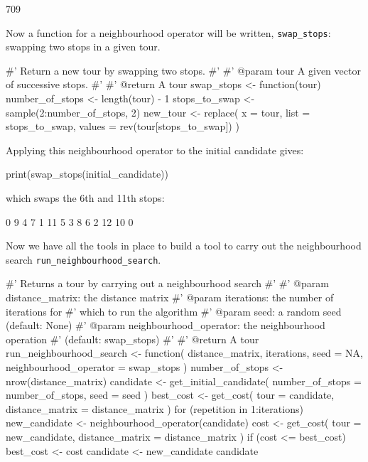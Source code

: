 \begin{Rout}
[1] 709
\end{Rout}

Now a function for a neighbourhood operator will be written,
\texttt{swap_stops}: swapping two stops in a given tour.

\begin{Rin}
#' Return a new tour by swapping two stops.
#'
#' @param tour A given vector of successive stops.
#'
#' @return A tour
swap_stops <- function(tour){
  number_of_stops <- length(tour) - 1
  stops_to_swap <- sample(2:number_of_stops, 2)
  new_tour <- replace(
    x = tour,
    list = stops_to_swap,
    values = rev(tour[stops_to_swap])
  )
}
\end{Rin}

Applying this neighbourhood operator to the initial candidate gives:

\begin{Rin}
print(swap_stops(initial_candidate))
\end{Rin}

which swaps the 6th and 11th stops:

\begin{Rout}
 [1]  0  9  4  7  1 11  5  3  8  6  2 12 10  0
\end{Rout}

Now we have all the tools in place to build a tool to carry out the
neighbourhood search \texttt{run_neighbourhood_search}.

\begin{Rin}
#' Returns a tour by carrying out a neighbourhood search
#'
#' @param distance_matrix: the distance matrix
#' @param iterations: the number of iterations for
#'                    which to run the algorithm
#' @param seed: a random seed (default: None)
#' @param neighbourhood_operator: the neighbourhood operation
#'                                (default: swap_stops)
#'
#' @return A tour
run_neighbourhood_search <- function(
  distance_matrix,
  iterations,
  seed = NA,
  neighbourhood_operator = swap_stops
){
  number_of_stops <- nrow(distance_matrix)
  candidate <- get_initial_candidate(
    number_of_stops = number_of_stops,
    seed = seed
  )
  best_cost <- get_cost(
    tour = candidate,
    distance_matrix = distance_matrix
  )
  for (repetition in 1:iterations) {
    new_candidate <- neighbourhood_operator(candidate)
    cost <- get_cost(
        tour = new_candidate,
        distance_matrix = distance_matrix
    )
    if (cost <= best_cost) {
      best_cost <- cost
      candidate <- new_candidate
    }
  }
  candidate
}
\end{Rin}

